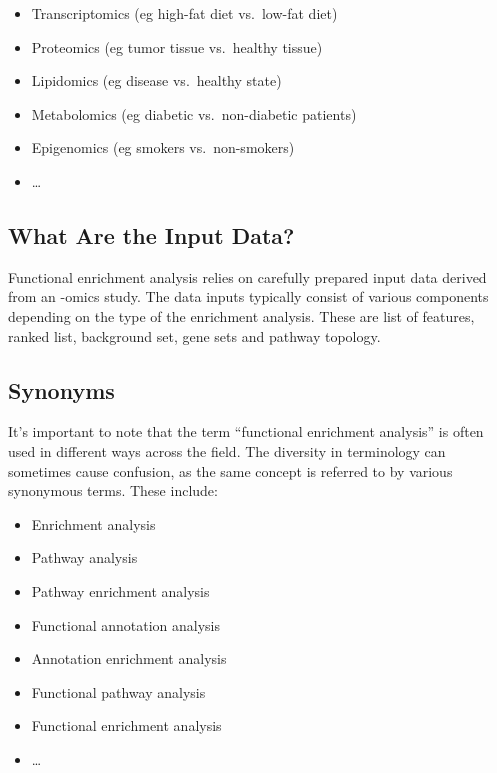 \documentclass[
]{book}
\providecommand{\tightlist}{%
  \setlength{\itemsep}{0pt}\setlength{\parskip}{0pt}}
\begin{document}
\begin{itemize}
\tightlist
\item
  Transcriptomics (eg high-fat diet vs.~low-fat diet)
\item
  Proteomics (eg tumor tissue vs.~healthy tissue)
\item
  Lipidomics (eg disease vs.~healthy state)
\item
  Metabolomics (eg diabetic vs.~non-diabetic patients)
\item
  Epigenomics (eg smokers vs.~non-smokers)
\item
  \ldots{}
\end{itemize}

\hypertarget{what-are-the-input-data}{%
\subsection{What Are the Input Data?}\label{what-are-the-input-data}}

Functional enrichment analysis relies on carefully prepared input data derived from an -omics study. The data inputs typically consist of various components depending on the type of the enrichment analysis. These are list of features, ranked list, background set, gene sets and pathway topology.

\hypertarget{synonyms}{%
\subsection{Synonyms}\label{synonyms}}

It's important to note that the term ``functional enrichment analysis'' is often used in different ways across the field. The diversity in terminology can sometimes cause confusion, as the same concept is referred to by various synonymous terms. These include:

\begin{itemize}
\tightlist
\item
  Enrichment analysis
\item
  Pathway analysis
\item
  Pathway enrichment analysis
\item
  Functional annotation analysis
\item
  Annotation enrichment analysis
\item
  Functional pathway analysis
\item
  Functional enrichment analysis
\item
  \ldots{}
\end{itemize}
\end{document}
